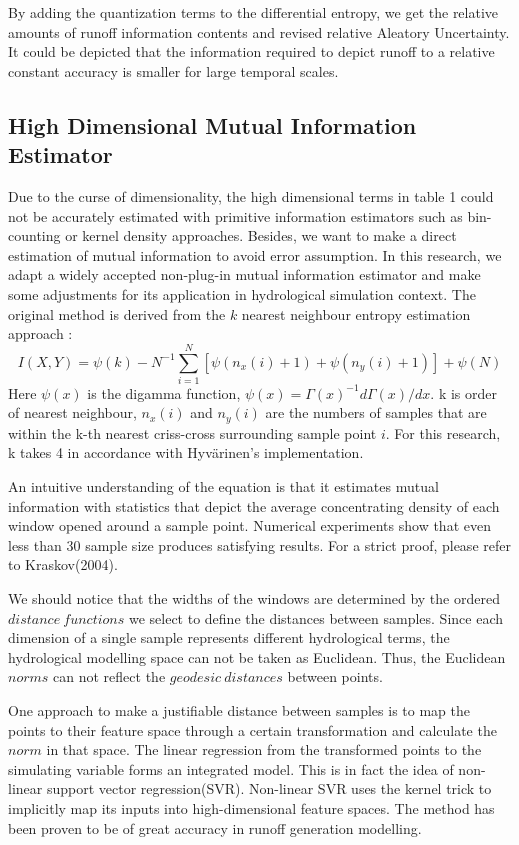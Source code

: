\documentclass[11pt]{article}
\begin{document}
By adding the quantization terms to the differential entropy, we get the relative amounts of runoff information contents and revised relative Aleatory Uncertainty. It could be depicted that the information required to depict runoff to a relative constant accuracy is smaller for large temporal scales.
\fi


\subsection{High Dimensional Mutual Information Estimator}
Due to the curse of dimensionality, the high dimensional terms in table 1 could not be accurately estimated with primitive information estimators such as bin-counting or kernel density approaches. Besides, we want to make a direct estimation of mutual information to avoid  error assumption. In this research, we adapt a widely accepted non-plug-in mutual information estimator and make some adjustments for its application in hydrological simulation context. The original method is derived from the $k$ nearest neighbour entropy estimation approach \cite{kraskov2004estimating}:
\begin{equation}\label{Kraskov}
I(X,Y)=\psi(k)-N^{-1}\sum_{i=1}^{N}[\psi(n_x(i)+1)+\psi(n_y(i)+1)]+\psi(N)
\end{equation}
Here $\psi(x)$ is the digamma function, $\psi(x)=\Gamma(x)^{-1}d\Gamma(x)/dx$. k is order of nearest neighbour, $n_x(i)$ and $n_y(i)$ are the numbers of samples that are within the k-th nearest  criss-cross surrounding sample point $i$. For this research, k takes 4 in accordance with Hyv{\"a}rinen's implementation.

An intuitive understanding of the equation is that it estimates mutual information with statistics that depict the average concentrating density of each window opened around a sample point. Numerical experiments show that even less than 30 sample size produces satisfying results. For a strict proof, please refer to Kraskov(2004).

We should notice that the widths of the windows are determined by the ordered $distance~functions$ we select to define the distances between samples. Since each dimension of a single sample represents different hydrological terms, the hydrological modelling space can not be taken as Euclidean. Thus, the Euclidean $norms$ can not reflect the $geodesic      ~distances$ between points. 
 
 
One approach to make a justifiable distance between samples   is to map the points to their feature space through a certain transformation and calculate the $norm$ in that space. The linear regression from the transformed points to the simulating variable forms an integrated model. This is in fact the idea of non-linear support vector regression(SVR). Non-linear SVR uses the kernel trick to implicitly map its inputs into high-dimensional feature spaces. The method has been proven to be of great accuracy in runoff generation modelling\cite{dibike2001model,lin2006using,asefa2006multi,behzad2009generalization,phdgong}.
\end{document}
